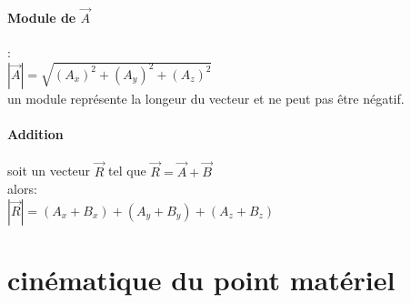 \documentclass[a4paper,11pt]{article}
\begin{document}
	\paragraph{Module de $\vec{A}$}:\\
	$|\vec{A}|=\sqrt{(A_x)^2+(A_y)^2+(A_z)^2}$\\ un module représente la longeur 	du vecteur et ne peut pas être négatif.
	
	\paragraph{Addition}
	soit un vecteur $\vec{R}$ tel que $\vec{R}=\vec{A}+\vec{B}$\\
	alors:\\
	$|\vec{R}|=(A_x+B_x)+(A_y+B_y)+(A_z+B_z)$		
	
\section{cinématique du point matériel}
\end{document}
